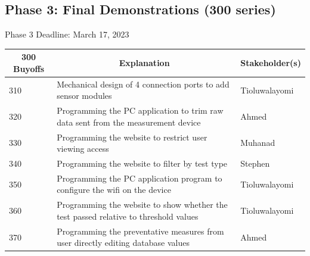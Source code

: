 \documentclass[12pt,titlepage]{article}
\begin{document}
\noindent
\subsection{Phase 3: Final Demonstrations (300 series)}
Phase 3 Deadline: March 17, 2023\\

\begin{table}[H]
  \centering
  \begin{tabular}{|p{2cm}|p{10cm}|p{2cm}|}
  \hline
  \multicolumn{1}{|c|}{\textbf{300 Buyoffs}} & \multicolumn{1}{c|}{\textbf{Explanation}} & \multicolumn{1}{|c|}{\textbf{Stakeholder(s)}}
  \\ \hline
  310
  & Mechanical design of 4 connection ports to add sensor modules
  & Tioluwalayomi
  \newline                                
  \\ \hline

  320
  & Programming the PC application to trim raw data sent from the measurement device
  & Ahmed
  \newline                                
  \\ \hline

  330                              
  & Programming the website to restrict user viewing access
  & Muhanad
  \newline                                
  \\ \hline

  340
  & Programming the website to filter by test type
  & Stephen
  \newline                                
  \\ \hline

  350                          
  & Programming the PC application program to configure the wifi on the device
  & Tioluwalayomi
  \newline                                
  \\ \hline

  360                                
  & Programming the website to show whether the test passed relative to threshold values
  & Tioluwalayomi 
  \newline                            
  \\ \hline

  370                                
  & Programming the preventative measures from user directly editing database values
  & Ahmed 
  \newline    
  \\ \hline


\end{tabular}
\end{table}
\end{document}
